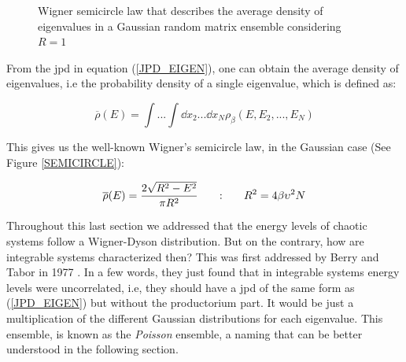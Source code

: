 \documentclass[11pt,a4paper]{article}
\begin{document}
\begin{figure}
    \centering
    \caption{Wigner semicircle law that describes the average density of eigenvalues in a Gaussian random matrix ensemble considering $R=1$}
\end{figure}



From the jpd in equation (\ref{JPD_EIGEN}), one can obtain the average density of eigenvalues, i.e the probability density of a single eigenvalue, which is defined as: 

\begin{equation}
    \overline{\rho}(E)=\int...\int \dd x_2...\dd x_N \rho_\beta(E,E_2,...,E_N)
\end{equation}

{\noindent This gives us the well-known Wigner's semicircle law, in the Gaussian case \cite{wigner_characteristic_1955} (See Figure \ref{SEMICIRCLE}):}

\begin{equation}\LA{SEMICIRCLE_EQ}
    \overline{\rho}(E) = \frac{2\sqrt{R^2-E^2}}{\pi R^2} ~~~~~ : ~~~~~ R^2 = 4\beta \upsilon^2 N
\end{equation}

Throughout this last section we addressed that the energy levels of chaotic systems follow a Wigner-Dyson distribution. But on the contrary, how are integrable systems characterized then? This was first addressed by Berry and Tabor in 1977 \cite{berry_level_1997}. In a few words, they just found that in integrable systems energy levels were uncorrelated, i.e, they should have a jpd of the same form as (\ref{JPD_EIGEN}) but without the productorium part. It would be just a multiplication of the different Gaussian distributions for each eigenvalue. This ensemble, is known as the \textit{Poisson} ensemble, a naming that can be better understood in the following section.
\end{document}
